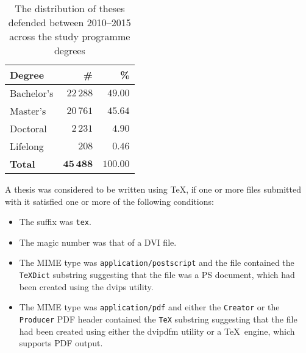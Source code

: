 \documentclass[11pt,twoside]{article}
\begin{document}
\begin{frame}
  \begin{table}[!b]
    \begin{tabularx}{\textwidth}{Xrr}
      \textbf{Degree} & \textbf{\#} & \textbf{\%} \\
      \toprule
      Bachelor's & $22\,288$ & $49.00$ \\
      Master's   & $20\,761$ & $45.64$ \\
      Doctoral   &  $2\,231$ &  $4.90$ \\
      Lifelong   &     $208$ &  $0.46$ \\
      \bottomrule
      \textbf{Total} & $\mathbf{45\,488}$ & $\mathbf{100.00}$
    \end{tabularx}
    \caption{The distribution of theses defended between 2010--2015
      across the study programme degrees}
  \end{table}
\end{frame}\begin{frame}
  A thesis was considered to be written using \TeX, if one
  or more files submitted with it satisfied one or more of the
  following conditions: \begin{itemize}
    \item The suffix was \texttt{tex}.
    \item The magic number was that of a DVI file.
    \item The MIME type was \texttt{application/postscript} and
      the file contained the \texttt{TeXDict} substring suggesting
      that the file was a PS document, which had been created
      using the \textsf{dvips} utility.
    \item The MIME type was \texttt{application/pdf} and either
      the \texttt{Creator} or the \texttt{Producer} PDF 
      header contained the \texttt{TeX} substring suggesting that
      the file had been created using either the \textsf{dvipdfm}
      utility or a \TeX\ engine, which supports PDF output.
  \end{itemize}
\end{frame}
\end{document}
